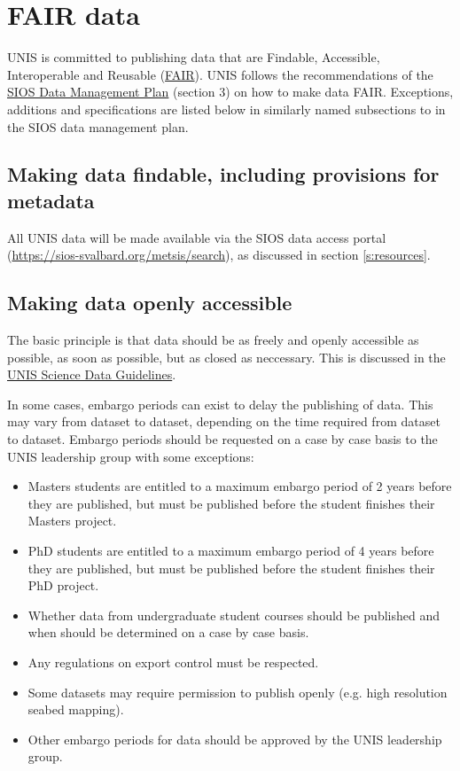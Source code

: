 \documentclass[a4paper,english, 11pt]{article}
\begin{document}
\section{FAIR data}
\label{s:fair}

UNIS is committed to publishing data that are Findable, Accessible, Interoperable and Reusable (\href{https://www.go-fair.org/fair-principles/}{FAIR}). UNIS follows the recommendations of the \href{https://sios-svalbard.org/sites/sios-svalbard.org/files/common/Documents/SIOS_Data_Management_Plan.pdf}{SIOS Data Management Plan} (section 3) on how to make data FAIR. Exceptions, additions and specifications are listed below in similarly named subsections to in the SIOS data management plan.

\subsection{Making data findable, including provisions for metadata}
\label{ss:findable}

All UNIS data will be made available via the SIOS data access portal (\url{https://sios-svalbard.org/metsis/search}), as discussed in section \ref{s:resources}. 

\subsection{Making data openly accessible}
\label{ss:accessible}

The basic principle is that data should be as freely and openly accessible as possible, as soon as possible, but as closed as neccessary. This is discussed in the \href{https://www.unis.no/wp-content/uploads/2025/11/sciencedataguidelines.pdf}{UNIS Science Data Guidelines}. 

In some cases, embargo periods can exist to delay the publishing of data. This may vary from dataset to dataset, depending on the time required from dataset to dataset. Embargo periods should be requested on a case by case basis to the UNIS leadership group with some exceptions:

 \begin{itemize}
 \item Masters students are entitled to a maximum embargo period of 2 years before they are published, but must be published before the student finishes their Masters project. 
 \item PhD students are entitled to a maximum embargo period of 4 years before they are published, but must be published before the student finishes their PhD project.
 \item Whether data from undergraduate student courses should be published and when should be determined on a case by case basis. 
\item Any regulations on export control must be respected.
\item Some datasets may require permission to publish openly (e.g. high resolution seabed mapping). 
\item Other embargo periods for data should be approved by the UNIS leadership group.
 \end{itemize}
\end{document}
